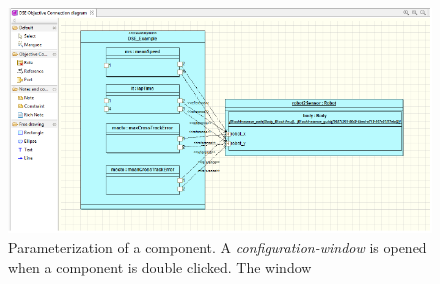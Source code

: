 \begin{figure}[bt]
\centering
\includegraphics[width=\columnwidth]{Images/dse_connection_diagram.pdf}
\caption{Parameterization of a component. A \emph{configuration-window} is opened when a component is double clicked. The window }
\label{fig:dse_connection_diagram}
\end{figure}
